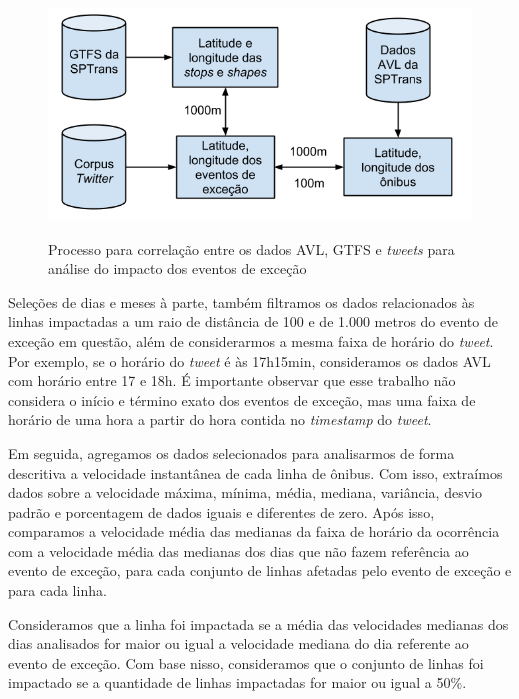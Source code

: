 \documentclass[
	12pt,				%
	oneside,			%
	a4paper,			%
	english,			%
	brazil				%
	]{abntex2ppgsi}
\begin{document}
{{{\begin{figure}[!htb]
	\centering
 	  \caption{Processo para correlação entre os dados AVL, GTFS e \textit{tweets} para análise do impacto dos eventos de exceção}
		\includegraphics[width=0.7\linewidth]{images/avl_tweets_correlation_pt.png}
	\label{fig:avl_tweets_correlation_pt}
\end{figure}

Seleções de dias e meses à parte,  também filtramos os dados relacionados às linhas impactadas a um raio de distância de 100 e de 1.000 metros do evento de exceção em questão, além de considerarmos a mesma faixa de horário do \textit{tweet}. Por exemplo, se o horário do \textit{tweet} é às 17h15min, consideramos os dados AVL com horário entre 17 e 18h. É importante observar que esse trabalho não considera o início e término exato dos eventos de exceção, mas uma faixa de horário de uma hora a partir do hora contida no \textit{timestamp}  do \textit{tweet}.

Em seguida, agregamos os dados selecionados para analisarmos  de forma descritiva a velocidade instantânea de cada linha de ônibus. Com isso, extraímos dados sobre a velocidade máxima, mínima, média, mediana, variância, desvio padrão e porcentagem de dados iguais e diferentes de zero.  Após isso, comparamos a velocidade média das medianas da faixa de horário da ocorrência com a velocidade média das medianas dos dias que não fazem referência ao evento de exceção, para cada conjunto de linhas afetadas pelo evento de exceção e para cada linha. 

Consideramos que a linha foi impactada se a média das velocidades medianas dos dias analisados for maior ou igual a velocidade mediana do dia referente ao evento de exceção. Com base nisso, consideramos que o conjunto de linhas foi impactado se a quantidade de linhas impactadas for maior ou igual a 50\%.

}}}
\end{document}
